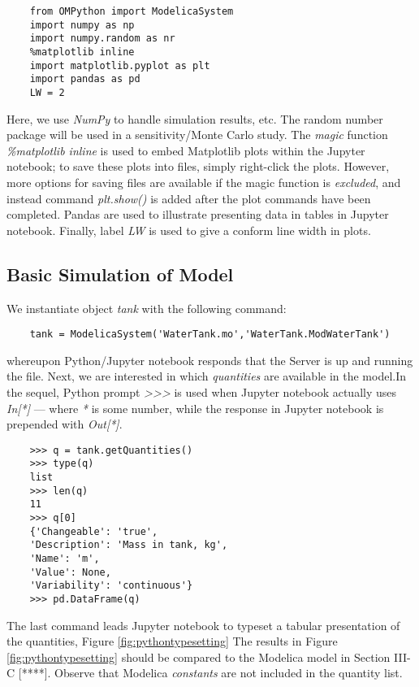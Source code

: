 \begin{lstlisting}
	from OMPython import ModelicaSystem
	import numpy as np
	import numpy.random as nr
	%matplotlib inline
	import matplotlib.pyplot as plt
	import pandas as pd
	LW = 2
\end{lstlisting}

Here, we use \textit{NumPy} to handle simulation results, etc. The random number package will be used in
a sensitivity/Monte Carlo study. The \textit{magic} function \textit{\%matplotlib inline} is used to embed Matplotlib
plots within the Jupyter notebook; to save these plots into files, simply right-click the plots. However, more options
for saving files are available if the magic function is \textit{excluded}, and instead command \textit{plt.show()} is added
after the plot commands have been completed. Pandas are used to illustrate presenting data in tables in Jupyter
notebook. Finally, label \textit{LW} is used to give a conform line width in plots.

\subsection{Basic Simulation of Model}
\label{subsec:pythonsimulatemodel}

We instantiate object \textit{tank} with the following command:

\begin{lstlisting}
	tank = ModelicaSystem('WaterTank.mo','WaterTank.ModWaterTank')
\end{lstlisting}

whereupon Python/Jupyter notebook responds that the \cite{omc} Server is up and running the file. Next, we are
interested in which \textit{quantities} are available in the model.In the sequel, Python prompt \textit{>>>} is used when Jupyter
notebook actually uses \textit{In[*]} — where \textit{*} is some number, while the response in Jupyter notebook is prepended
with \textit{Out[*]}.

\begin{lstlisting}
	>>> q = tank.getQuantities()
	>>> type(q)
	list
	>>> len(q)
	11
	>>> q[0]
	{'Changeable': 'true', 
	'Description': 'Mass in tank, kg',
	'Name': 'm',
	'Value': None,
	'Variability': 'continuous'}
	>>> pd.DataFrame(q)
\end{lstlisting}

The last command leads Jupyter notebook to typeset a tabular presentation of the quantities, Figure \ref{fig:pythontypesetting}  The results
in Figure \ref{fig:pythontypesetting} should be compared to the Modelica model in Section III-C [****]. Observe that Modelica \textit{constants} are not included in the quantity list.

